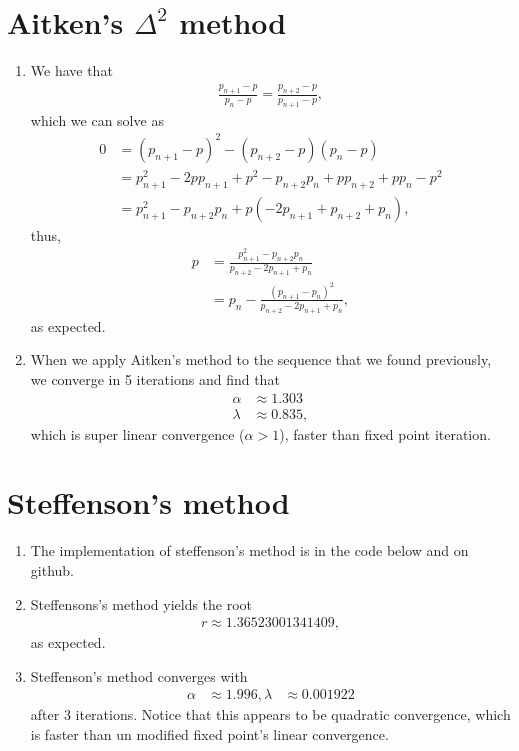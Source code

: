 \documentclass[10pt]{article}
\begin{document}
\section{Aitken's $\Delta^2$ method}
\begin{enumerate}
  \item We have that \begin{align*}
      \frac{p_{n+1} - p}{p_n - p} = \frac{p_{n+2} - p}{p_{n+1} - p},
  \end{align*} which we can solve as \begin{align*}
      0 &= (p_{n+1}-p)^2 - (p_{n+2} - p)(p_n-p) \\
      &= p_{n+1}^2 - 2pp_{n+1} + p^2 - p_{n+2}p_n + pp_{n+2} + pp_n - p^2 \\
      &= p_{n+1}^2 - p_{n+2}p_n + p(-2p_{n+1} + p_{n+2} + p_n),
  \end{align*} thus, \begin{align*}
    p &= \frac{p_{n+1}^2 - p_{n+2}p_n}{p_{n+2} - 2p_{n+1}+p_n} \\
    &= p_n - \frac{(p_{n+1}-p_n)^2}{p_{n+2} - 2p_{n+1}+p_n},
  \end{align*} as expected.

  \item When we apply Aitken's method to the sequence that we found previously, we converge in 5 iterations and find that \begin{align*}
    \alpha &\approx 1.303 \\
    \lambda &\approx 0.835,
  \end{align*} which is super linear convergence (\(\alpha > 1\)), faster than fixed point iteration.
\end{enumerate}

\section{Steffenson's method}
\begin{enumerate}
\item The implementation of steffenson's method is in the code below and on github.

\item Steffensons's method yields the root \begin{align*}
    r \approx 1.36523001341409,
\end{align*} as expected.

\item Steffenson's method converges with \begin{align*}
    \alpha &\approx 1.996,
    \lambda &\approx 0.001922
\end{align*} after 3 iterations. Notice that this appears to be quadratic convergence, which is faster than un modified fixed point's linear convergence.
\end{enumerate}

{\small }   
\end{document}
